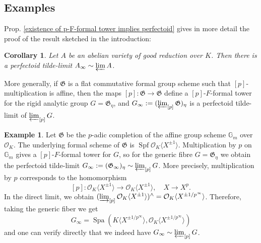 \documentclass[10pt,oneside]{amsart}
\newtheorem{corollary}[theorem]{Corollary}
\theoremstyle{definition}
\newtheorem{remark}[theorem]{Remark}
\newtheorem*{example}{Example}
\begin{document}
\subsection{Examples}	
Prop. \ref{existence of p-F-formal tower implies perfectoid} gives in more detail the proof of the result sketched in the introduction:
	\begin{corollary}\label{tilde-limit exists and is perfectoid in the good reduction case}
		Let $A$ be an abelian variety of good reduction over $K$. Then there is a perfectoid tilde-limit $A_\infty\sim \varprojlim A$.
	\end{corollary}
	 	
More generally, if $\mathfrak G$ is a flat commutative formal group scheme such that $[p]$-multiplication is affine, then the maps $[p]:\mathfrak G \rightarrow \mathfrak G$ define a $[p]$-$F$-formal tower for the rigid analytic group $G=\mathfrak G_\eta$, and  $G_\infty := (\varprojlim_{[p]}\mathfrak G)_\eta$ is a perfectoid tilde-limit of $\varprojlim_{[p]} G$. 

					
		
	\begin{example}
		Let $\mathfrak G$ be the $p$-adic completion of the affine group scheme $\mathbb G_m$ over $\mathcal O_K$. The underlying formal scheme of $\mathfrak G$ is $\operatorname {Spf} \mathcal O_K\langle X^{\pm 1} \rangle$.  Multiplication by $p$ on $\mathbb G_m$ gives a $[p]$-$F$-formal tower for $G$, so for the generic fibre $G=\mathfrak G_\eta$ we obtain the perfectoid tilde-limit $G_\infty := (\mathfrak G_\infty)_{\eta} \sim \varprojlim_{[p]} G$. More precisely,  multiplication by $p$ corresponds to the homomorphism
		\[[p]:\mathcal O_K\langle X^{\pm 1} \rangle\rightarrow  \mathcal O_K\langle X^{\pm 1} \rangle, \quad X\rightarrow X^{p}.\]
		In the direct limit, we obtain $   (\varinjlim_{[p]} \mathcal O_K\langle X^{\pm 1} \rangle  )^{\wedge} = \mathcal O_K\langle  X^{\pm 1/p^\infty} \rangle$.  Therefore, taking the generic fiber we get
		$$G_\infty = \operatorname{Spa}(K\langle X^{\pm 1/p^\infty} \rangle,\mathcal O_K\langle X^{\pm 1/p^\infty} \rangle)$$
		and one can verify directly that we indeed have $G_\infty \sim \varprojlim_{[p]} G$.
	\end{example}
	
\end{document}
